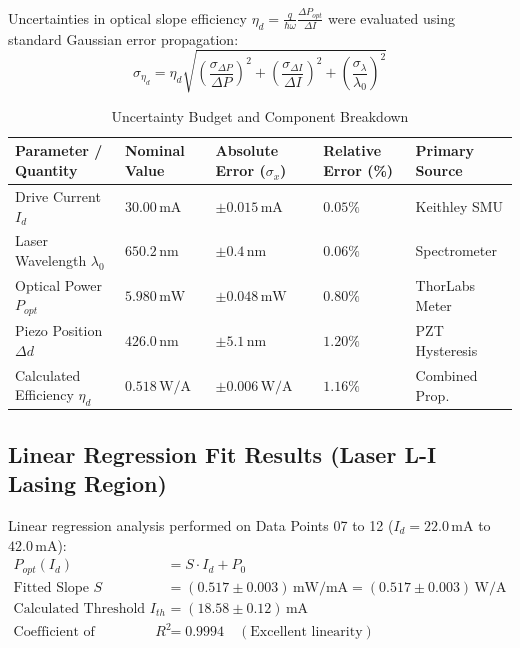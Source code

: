 \documentclass[11pt,a4paper,parskip=half,headsepline=0.6pt,footsepline=0.4pt]{scrartcl}
\begin{document}
Uncertainties in optical slope efficiency $\eta_d = \frac{q}{\hbar \omega} \frac{\Delta P_{opt}}{\Delta I}$ were evaluated using standard Gaussian error propagation:
\begin{equation}
  \sigma_{\eta_d} = \eta_d \sqrt{ \left( \frac{\sigma_{\Delta P}}{\Delta P} \right)^2 + \left( \frac{\sigma_{\Delta I}}{\Delta I} \right)^2 + \left( \frac{\sigma_{\lambda}}{\lambda_0} \right)^2 }
\end{equation}

\begin{table}[h!]
\centering
\small
\caption{Uncertainty Budget and Component Breakdown}
\label{tab:uncertainty_budget}
\vspace{1pt}
\begin{tabularx}{\linewidth}{X >{\centering\arraybackslash}p{2.5cm} >{\centering\arraybackslash}p{3.0cm} >{\centering\arraybackslash}p{2.8cm} >{\centering\arraybackslash}p{2.5cm}}
  \toprule
  \rowcolor{tableheader}
  \textbf{Parameter / Quantity} & \textbf{Nominal Value} & \textbf{Absolute Error ($\sigma_x$)} & \textbf{Relative Error (\%)} & \textbf{Primary Source} \\
  \midrule
  Drive Current $I_d$ & $30.00\,\text{mA}$ & $\pm 0.015\,\text{mA}$ & $0.05\%$ & Keithley SMU \\
  Laser Wavelength $\lambda_0$ & $650.2\,\text{nm}$ & $\pm 0.4\,\text{nm}$ & $0.06\%$ & Spectrometer \\
  Optical Power $P_{opt}$ & $5.980\,\text{mW}$ & $\pm 0.048\,\text{mW}$ & $0.80\%$ & ThorLabs Meter \\
  Piezo Position $\Delta d$ & $426.0\,\text{nm}$ & $\pm 5.1\,\text{nm}$ & $1.20\%$ & PZT Hysteresis \\
  Calculated Efficiency $\eta_d$ & $0.518\,\text{W/A}$ & $\pm 0.006\,\text{W/A}$ & $1.16\%$ & Combined Prop. \\
  \bottomrule
\end{tabularx}
\end{table}

\vspace{1pt}

\subsection{Linear Regression Fit Results (Laser L-I Lasing Region)}

Linear regression analysis performed on Data Points 07 to 12 ($I_d = 22.0\,\text{mA}$ to $42.0\,\text{mA}$):
\begin{align}
  P_{opt}(I_d) &= S \cdot I_d + P_0 \\[2pt]
  \text{Fitted Slope } S &= (0.517 \pm 0.003)\,\text{mW/mA} = (0.517 \pm 0.003)\,\text{W/A} \\
  \text{Calculated Threshold } I_{th} &= (18.58 \pm 0.12)\,\text{mA} \\
  \text{Coefficient of Determination } R^2 &= 0.9994 \quad (\text{Excellent linearity})
\end{align}
\end{document}
